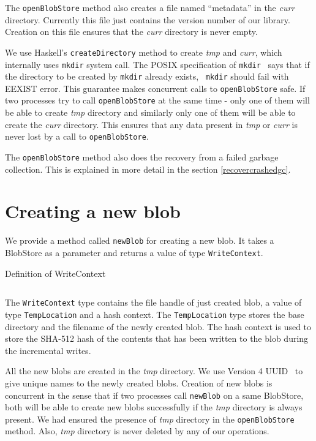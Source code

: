 The \texttt{openBlobStore} method also creates a file named ``metadata'' in the \textit{curr} directory. Currently this file just contains the version
number of our library. Creation on this file ensures that the \textit{curr} directory is never empty.

We use Haskell's \texttt{createDirectory} method to create \textit{tmp} and \textit{curr}, which internally uses \texttt{mkdir} system call.
The POSIX specification of \texttt{mkdir}~\cite{mkdirposix} says that if the directory to be created by \texttt{mkdir} already exists, ~\texttt{mkdir} should fail with EEXIST error.
This guarantee makes concurrent calls to \texttt{openBlobStore} safe. If two processes try to call \texttt{openBlobStore} at the same time - only one of them will be able to create \textit{tmp} directory and similarly only one of them will be able to create the \textit{curr} directory.
This ensures that any data present in \textit{tmp} or \textit{curr} is never lost by a call to \texttt{openBlobStore}.

The \texttt{openBlobStore} method also does the recovery from a failed garbage collection. This is explained in more detail in the section \ref{recovercrashedgc}.

\section{Creating a new blob}
We provide a method called \texttt{newBlob} for creating a new blob. It takes a BlobStore as a parameter and returns a value of type \texttt{WriteContext}.

\begin{program}
  \caption{Definition of WriteContext}
  \label{prog:defwritecontext}
  \inputminted{haskell}{hs/writecontext.hs}
\end{program}

The \texttt{WriteContext} type contains the file handle of just created blob, a value of type \texttt{TempLocation} and a hash context. The \texttt{TempLocation} type stores the base directory and the filename of the newly created blob. The hash context is used to store the SHA-512 hash of the contents that has been written to the blob during the incremental writes.

All the new blobs are created in the \textit{tmp} directory. We use Version 4 UUID~\cite{leach2005universally} to give unique names to the newly created blobs.
Creation of new blobs is concurrent in the sense that if two processes call \texttt{newBlob} on a same BlobStore, both will be able to create new blobs successfully if the \textit{tmp} directory is always present. We had ensured the presence of \textit{tmp} directory in the \texttt{openBlobStore} method. Also, \textit{tmp} directory is never deleted by any of our operations.

